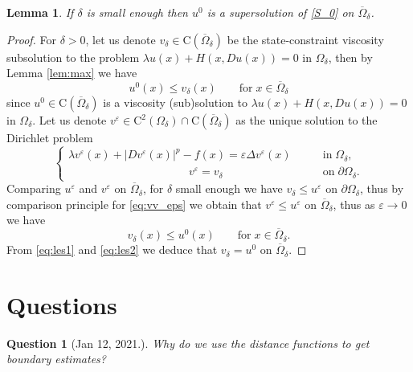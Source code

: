 \documentclass[11pt,reqno]{amsart}
\numberwithin{figure}{section}
\theoremstyle{plain}
\newtheorem{quest}{Question}
\newtheorem{lem}[thm]{Lemma}
\theoremstyle{remark}
\numberwithin{equation}{section}
\newcommand{\rmC}{\mathrm{C}}
\begin{document}
\begin{lem} If $\delta$ is small enough then $u^0$ is a supersolution of \eqref{S_0} on $\overline{\Omega}_\delta$.
\end{lem}
\begin{proof} For $\delta>0$, let us denote $v_\delta\in\rmC(\overline{\Omega}_\delta)$ be the state-constraint viscosity subsolution to the problem $\lambda u(x) + H(x,Du(x)) = 0$ in $\Omega_\delta$, then by Lemma  \ref{lem:max} we have
\begin{equation}\label{eq:les1}
   u^0(x) \leq v_\delta(x) \qquad\text{for}\;x\in \overline{\Omega}_\delta
\end{equation}
since $u^0 \in \rmC(\overline{\Omega}_\delta)$ is a viscosity (sub)solution to $\lambda u(x) + H(x,Du(x)) = 0$ in $\Omega_\delta$. Let us denote $v^\varepsilon\in \rmC^2(\Omega_\delta)\cap \rmC(\overline{\Omega}_\delta)$ as the unique solution to the Dirichlet problem
\begin{equation}\label{eq:vv_eps}
\begin{cases}
    \lambda v^\varepsilon(x) + |Dv^\varepsilon(x)|^p - f(x) = \varepsilon \Delta v^\varepsilon(x) &\qquad\text{in}\;\Omega_\delta,\\
    \;\;\,\quad\quad\qquad\qquad\qquad\qquad v^\varepsilon = v_\delta &\qquad \text{on}\;\partial\Omega_\delta.
\end{cases}
\end{equation}
Comparing $u^\varepsilon$ and $v^\varepsilon$ on $\overline{\Omega}_\delta$, for $\delta$ small enough we have $v_\delta\leq u^\varepsilon$ on $\partial \Omega_\delta$, thus by comparison principle for \eqref{eq:vv_eps} we obtain that $v^\varepsilon \leq u^\varepsilon$ on $\overline{\Omega}_\delta$, thus as $\varepsilon\to 0$ we have
\begin{equation}\label{eq:les2}
    v_\delta(x) \leq u^0(x)  \qquad\text{for}\;x\in \overline{\Omega}_\delta.
\end{equation}
From \eqref{eq:les1} and \eqref{eq:les2} we deduce that $v_\delta = u^0$ on $\overline{\Omega}_\delta$.
\end{proof}








\section{Questions}
\begin{quest} [Jan 12, 2021.] Why do we use the distance functions to get boundary estimates? 
\end{quest}
\end{document}

